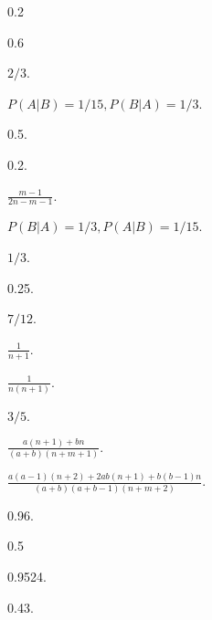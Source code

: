 \begin{answer}
  \item \begin{enumerate*}
    \item 0.2
    \item 0.6
  \end{enumerate*}

  \item $2/3$.

  \item $P(A|B)=1/15,P(B|A)=1/3$.

  \item 0.5.

  \item 0.2.

  \item $\frac{m-1}{2n-m-1}$.

  \item $P(B|A)=1/3,P(A|B)=1/15$.

  \item $1/3$.

  \item 0.25.

  \item $7/12$.

  \item \begin{enumerate*}
    \item $\frac1{n+1}$.
    \item $\frac1{n(n+1)}$.
  \end{enumerate*}

  \item $3/5$.

  \item \begin{enumerate*}
    \item $\frac{a(n+1)+bn}{(a+b)(n+m+1)}$.
    \item $\frac{a(a-1)(n+2)+2ab(n+1)+b(b-1)n}{(a+b)(a+b-1)(n+m+2)}$.
  \end{enumerate*}

  \item \begin{enumerate*}
    \item 0.96.
    \item 0.5
  \end{enumerate*}

  \item 0.9524.

  \item 0.43.


\end{answer}
